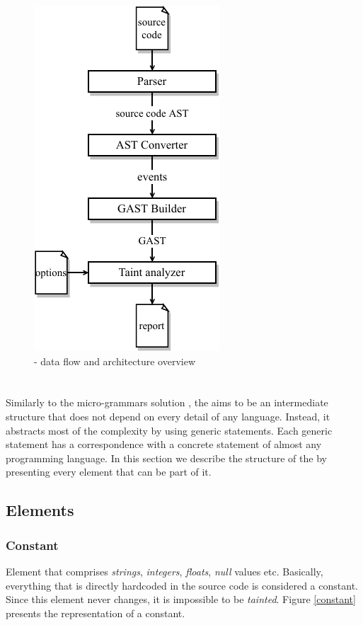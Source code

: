 \begin{figure}[hbt!]
    \centering
    \includegraphics[width =0.4\linewidth]{images/yasat-architecture.pdf}
    \caption{\toolname{} - data flow and architecture overview} 
    \label{architecture}
\end{figure}

\section{\astname{}}
\label{genericast}
Similarly to the micro-grammars solution \cite{microgrammars}, the \astname{} aims to be an intermediate structure that does not depend on every detail of any language. Instead, it abstracts most of the complexity by using generic statements. Each generic statement has a correspondence with a concrete statement of almost any programming language. In this section we describe the structure of the \astname{} by presenting every element that can be part of it. 

\subsection{Elements}

\subsubsection{Constant} 
Element that comprises \textit{strings}, \textit{integers}, \textit{floats}, \textit{null} values etc. Basically, everything that is directly hardcoded in the source code is considered a constant. Since this element never changes, it is impossible to be \textit{tainted}. Figure \ref{constant} presents the \astname{} representation of a constant.

